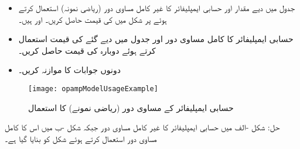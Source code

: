 \begin{itemize}
\item
جدول  میں دیے مقدار اور حسابی ایمپلیفائر کا غیر کامل مساوی دور (ریاضی نمونہ) استعمال کرتے ہوئے  پر  شکل  میں  کی قیمت حاصل کریں۔ اور  ہیں۔
\item
حسابی ایمپلیفائر کا کامل مساوی دور اور جدول  میں دیے گئے  کی قیمت استعمال کرتے ہوئے  دوبارہ   کی قیمت حاصل کریں۔
\item
دونوں جوابات کا موازنہ کریں۔
\end{itemize}
%
\begin{figure}
\centering
\texttt{[image: opampModelUsageExample]}
\caption{حسابی ایمپلیفائر کے مساوی دور (ریاضی نمونے) کا استعمال}
\label{شکل_حسابی_ماڈل_استعمال}
\end{figure}
%
حل:
شکل -الف میں حسابی ایمپلیفائر کا غیر کامل مساوی دور جبکہ شکل  -ب     میں اس کا کامل مساوی دور استعمال کرتے ہوئے شکل  کو بنایا گیا ہے۔
